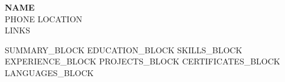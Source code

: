 \documentclass[11pt,letterpaper]{article}
\begin{document}
{\Huge \textbf{{{NAME}}}}\\
{{PHONE}} \hfill {{LOCATION}}\\
{{LINKS}}

{{SUMMARY_BLOCK}}
{{EDUCATION_BLOCK}}
{{SKILLS_BLOCK}}
{{EXPERIENCE_BLOCK}}
{{PROJECTS_BLOCK}}
{{CERTIFICATES_BLOCK}}
{{LANGUAGES_BLOCK}}
\end{document}
